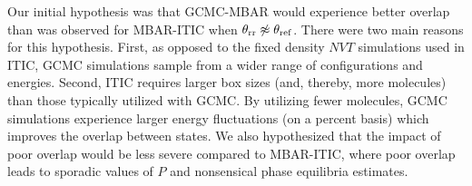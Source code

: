 \documentclass[journal=jced,manuscript=article]{achemso}
\begin{document}





Our initial hypothesis was that GCMC-MBAR would experience better overlap than was observed for MBAR-ITIC when $\theta_{\rm rr} \not\approx \theta_{\rm ref}$. There were two main reasons for this hypothesis. First, as opposed to the fixed density $NVT$ simulations used in ITIC, GCMC simulations sample from a wider range of configurations and energies. Second, ITIC requires larger box sizes (and, thereby, more molecules) than those typically utilized with GCMC. By utilizing fewer molecules, GCMC simulations experience larger energy fluctuations (on a percent basis) which improves the overlap between states. We also hypothesized that the impact of poor overlap would be less severe compared to MBAR-ITIC, where poor overlap leads to sporadic values of $P$ and nonsensical phase equilibria estimates.  

\end{document}
